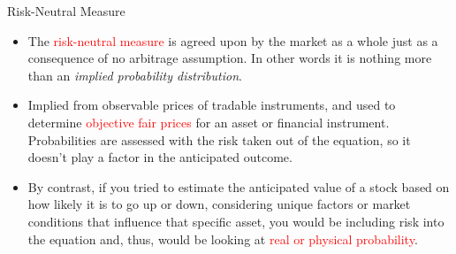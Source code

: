 \documentclass{beamer}
\begin{document}

\begin{frame}{Risk-Neutral Measure}
	\begin{itemize}
	\item<1->The \textcolor{red}{risk-neutral measure} is agreed upon by the market as a whole just as a consequence of no arbitrage assumption.
	In other words it is nothing more than an \emph{implied probability distribution}.
	\item<2-> Implied from observable prices of tradable instruments, and used to determine \textcolor{red}{objective fair prices} for an asset or financial instrument. Probabilities are assessed with the risk taken out of the equation, so it doesn’t play a factor in the anticipated outcome.
	\item<3-> By contrast, if you tried to estimate the anticipated value of a stock based on how likely it is to go up or down, considering unique factors or market conditions that influence that specific asset, you would be including risk into the equation and, thus, would be looking at \textcolor{red}{real or physical probability}.
	\end{itemize}
\end{frame}
\end{document}
